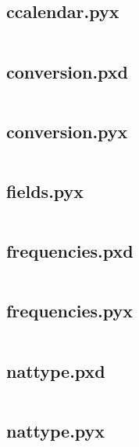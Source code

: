 \documentclass{article}
\begin{document}
\subsection{ccalendar.pyx}
\inputminted{cython}{/home/dufferzafar/dev/@clones/pandas/pandas/_libs/tslibs/ccalendar.pyx}
\newpage

\subsection{conversion.pxd}
\inputminted{cython}{/home/dufferzafar/dev/@clones/pandas/pandas/_libs/tslibs/conversion.pxd}
\newpage

\subsection{conversion.pyx}
\inputminted{cython}{/home/dufferzafar/dev/@clones/pandas/pandas/_libs/tslibs/conversion.pyx}
\newpage

\subsection{fields.pyx}
\inputminted{cython}{/home/dufferzafar/dev/@clones/pandas/pandas/_libs/tslibs/fields.pyx}
\newpage

\subsection{frequencies.pxd}
\inputminted{cython}{/home/dufferzafar/dev/@clones/pandas/pandas/_libs/tslibs/frequencies.pxd}
\newpage

\subsection{frequencies.pyx}
\inputminted{cython}{/home/dufferzafar/dev/@clones/pandas/pandas/_libs/tslibs/frequencies.pyx}
\newpage

\subsection{nattype.pxd}
\inputminted{cython}{/home/dufferzafar/dev/@clones/pandas/pandas/_libs/tslibs/nattype.pxd}
\newpage

\subsection{nattype.pyx}
\inputminted{cython}{/home/dufferzafar/dev/@clones/pandas/pandas/_libs/tslibs/nattype.pyx}
\newpage
\end{document}

